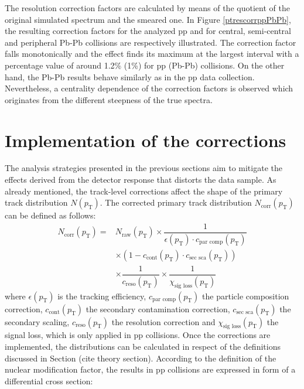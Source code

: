 \documentclass[12pt,a4paper]{report}
\begin{document}
The \pt resolution correction factors are calculated by means of the quotient of the original simulated \pt spectrum and the smeared one. In Figure \ref{ptrescorrppPbPb}, the resulting correction factors for the analyzed pp and for central, semi-central and peripheral Pb-Pb collisions are respectively illustrated. The correction factor falls monotonically and the effect finds its maximum at the largest \pt interval with a percentage value of around 1.2\% (1\%) for pp (Pb-Pb) collisions. On the other hand, the Pb-Pb results behave similarly as in the pp data collection. Nevertheless, a centrality dependence of the correction factors is observed which originates from the different steepness of the true \pt spectra.
\section{Implementation of the corrections}
\label{secCorr}
The analysis strategies presented in the previous sections aim to mitigate the effects derived from the detector response that distorts the data sample. As already mentioned, the track-level corrections affect the shape of the primary track distribution $N(p_\text{T})$. The corrected primary track distribution $N_\text{corr}(p_\text{T})$ can be defined as follows:
\begin{equation}
\begin{split}
N_\text{corr}(p_\text{T}) = & N_\text{raw}(p_\text{T}) \times \dfrac{1}{\epsilon(p_\text{T}) \cdot c_\text{par comp}(p_\text{T})} \\
& \times (1 - c_\text{cont}(p_\text{T}) \cdot c_\text{sec sca}(p_\text{T})) \\
&\times \dfrac{1}{c_\text{reso}(p_\text{T})} \times \dfrac{1}{\chi_\text{sig loss}(p_\text{T})} 
\end{split}
\end{equation}
where $\epsilon(p_\text{T})$ is the tracking efficiency, $c_\text{par comp}(p_\text{T})$ the particle composition correction, $c_\text{cont}(p_\text{T})$ the secondary contamination correction, $c_\text{sec sca}(p_\text{T})$ the secondary scaling, $c_\text{reso}(p_\text{T})$ the \pt resolution correction and $\chi_\text{sig loss}(p_\text{T})$ the signal loss, which is only applied in pp collisions. Once the corrections are implemented, the \pt distributions can be calculated in respect of the definitions discussed in Section (cite theory section).
According to the definition of the nuclear modification factor, the results in pp collisions are expressed in form of a differential cross section: 
\end{document}
